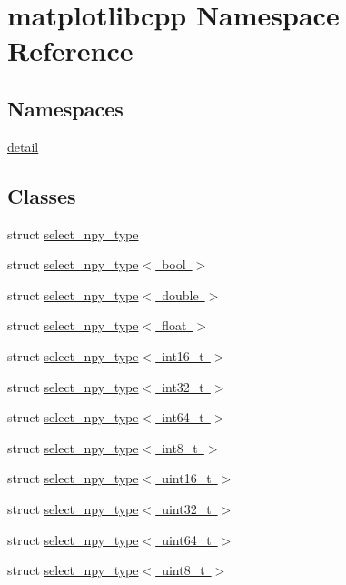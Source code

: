 \hypertarget{namespacematplotlibcpp}{}\section{matplotlibcpp Namespace Reference}
\label{namespacematplotlibcpp}
\subsection*{Namespaces}
\begin{DoxyCompactItemize}
\item 
 \mbox{\hyperlink{namespacematplotlibcpp_1_1detail}{detail}}
\end{DoxyCompactItemize}
\subsection*{Classes}
\begin{DoxyCompactItemize}
\item 
struct \mbox{\hyperlink{structmatplotlibcpp_1_1select__npy__type}{select\+\_\+npy\+\_\+type}}
\item 
struct \mbox{\hyperlink{structmatplotlibcpp_1_1select__npy__type_3_01bool_01_4}{select\+\_\+npy\+\_\+type$<$ bool $>$}}
\item 
struct \mbox{\hyperlink{structmatplotlibcpp_1_1select__npy__type_3_01double_01_4}{select\+\_\+npy\+\_\+type$<$ double $>$}}
\item 
struct \mbox{\hyperlink{structmatplotlibcpp_1_1select__npy__type_3_01float_01_4}{select\+\_\+npy\+\_\+type$<$ float $>$}}
\item 
struct \mbox{\hyperlink{structmatplotlibcpp_1_1select__npy__type_3_01int16__t_01_4}{select\+\_\+npy\+\_\+type$<$ int16\+\_\+t $>$}}
\item 
struct \mbox{\hyperlink{structmatplotlibcpp_1_1select__npy__type_3_01int32__t_01_4}{select\+\_\+npy\+\_\+type$<$ int32\+\_\+t $>$}}
\item 
struct \mbox{\hyperlink{structmatplotlibcpp_1_1select__npy__type_3_01int64__t_01_4}{select\+\_\+npy\+\_\+type$<$ int64\+\_\+t $>$}}
\item 
struct \mbox{\hyperlink{structmatplotlibcpp_1_1select__npy__type_3_01int8__t_01_4}{select\+\_\+npy\+\_\+type$<$ int8\+\_\+t $>$}}
\item 
struct \mbox{\hyperlink{structmatplotlibcpp_1_1select__npy__type_3_01uint16__t_01_4}{select\+\_\+npy\+\_\+type$<$ uint16\+\_\+t $>$}}
\item 
struct \mbox{\hyperlink{structmatplotlibcpp_1_1select__npy__type_3_01uint32__t_01_4}{select\+\_\+npy\+\_\+type$<$ uint32\+\_\+t $>$}}
\item 
struct \mbox{\hyperlink{structmatplotlibcpp_1_1select__npy__type_3_01uint64__t_01_4}{select\+\_\+npy\+\_\+type$<$ uint64\+\_\+t $>$}}
\item 
struct \mbox{\hyperlink{structmatplotlibcpp_1_1select__npy__type_3_01uint8__t_01_4}{select\+\_\+npy\+\_\+type$<$ uint8\+\_\+t $>$}}
\end{DoxyCompactItemize}
